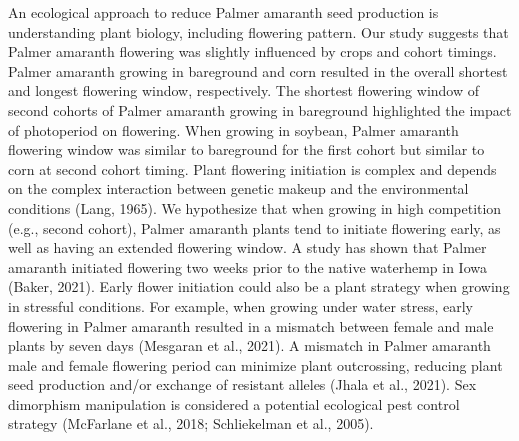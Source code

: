 \documentclass[utf8]{frontiersSCNS}
\begin{document}
An ecological approach to reduce Palmer amaranth seed production is
understanding plant biology, including flowering pattern. Our study
suggests that Palmer amaranth flowering was slightly influenced by crops
and cohort timings. Palmer amaranth growing in bareground and corn
resulted in the overall shortest and longest flowering window,
respectively. The shortest flowering window of second cohorts of Palmer
amaranth growing in bareground highlighted the impact of photoperiod on
flowering. When growing in soybean, Palmer amaranth flowering window was
similar to bareground for the first cohort but similar to corn at second
cohort timing. Plant flowering initiation is complex and depends on the
complex interaction between genetic makeup and the environmental
conditions (Lang, 1965). We hypothesize that when growing in high
competition (e.g., second cohort), Palmer amaranth plants tend to
initiate flowering early, as well as having an extended flowering
window. A study has shown that Palmer amaranth initiated flowering two
weeks prior to the native waterhemp in Iowa (Baker, 2021). Early flower
initiation could also be a plant strategy when growing in stressful
conditions. For example, when growing under water stress, early
flowering in Palmer amaranth resulted in a mismatch between female and
male plants by seven days (Mesgaran et al., 2021). A mismatch in Palmer
amaranth male and female flowering period can minimize plant
outcrossing, reducing plant seed production and/or exchange of resistant
alleles (Jhala et al., 2021). Sex dimorphism manipulation is considered
a potential ecological pest control strategy (McFarlane et al., 2018;
Schliekelman et al., 2005).
\end{document}
